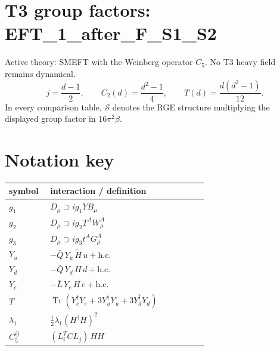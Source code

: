 \documentclass[9pt]{article}
\begin{document}
\section*{T3 group factors: EFT\_1\_after\_F\_S1\_S2}
Active theory: SMEFT with the Weinberg operator $C_5$.  No T3 heavy field remains dynamical.
\[j=\frac{d-1}{2},\qquad C_2(d)=\frac{d^2-1}{4},\qquad T(d)=\frac{d(d^2-1)}{12}.\]
In every comparison table, $\mathcal{S}$ denotes the RGE structure multiplying the displayed group factor in $16\pi^2\beta$.
\section*{Notation key}
\begin{longtable}{@{}p{0.19\linewidth}p{0.73\linewidth}@{}}
\toprule
symbol & interaction / definition \\
\midrule
$g_1$ & $D_\mu\supset i g_1 Y B_\mu$ \\
$g_2$ & $D_\mu\supset i g_2 T^A W_\mu^A$ \\
$g_3$ & $D_\mu\supset i g_3 t^A G_\mu^A$ \\
$Y_u$ & $-\bar Q\,Y_u\,\widetilde H\,u+\mathrm{h.c.}$ \\
$Y_d$ & $-\bar Q\,Y_d\,H\,d+\mathrm{h.c.}$ \\
$Y_e$ & $-\bar L\,Y_e\,H\,e+\mathrm{h.c.}$ \\
$T$ & $\operatorname{Tr}\!\left(Y_e^\dagger Y_e+3Y_u^\dagger Y_u+3Y_d^\dagger Y_d\right)$ \\
$\lambda_1$ & $\frac12\lambda_1(H^\dagger H)^2$ \\
$C_5^{ij}$ & $(L_i^T C L_j)\,H H$ \\
\bottomrule
\end{longtable}
\end{document}

